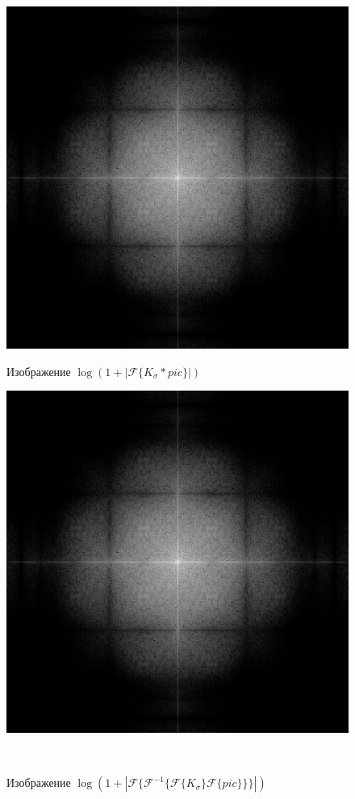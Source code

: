 \documentclass[a4paper]{article}
\begin{document}
\begin{figure}[H]
    \begin{minipage}{0.49\textwidth}
        \centering \includegraphics[width=\textwidth]{2/11_abs_fourier_log_norm_img_gaussian.png}
        \caption{Изображение $\log{(1+|\mathcal{F}\{K_\sigma*pic\}|)}$}
    \end{minipage}\hfill
    \begin{minipage}{0.49\textwidth}
        \centering \includegraphics[width=\textwidth]{2/11_abs_fourier_log_norm_img_gaussian1.png}
        \caption{Изображение $\log{(1+|\mathcal{F}\{\mathcal{F}^{-1}\{ \mathcal{F}\{K_\sigma\}\mathcal{F}\{pic\}\}\}|)}$}
    \end{minipage}\\[1em]
\end{figure}\noindent\
\end{document}
